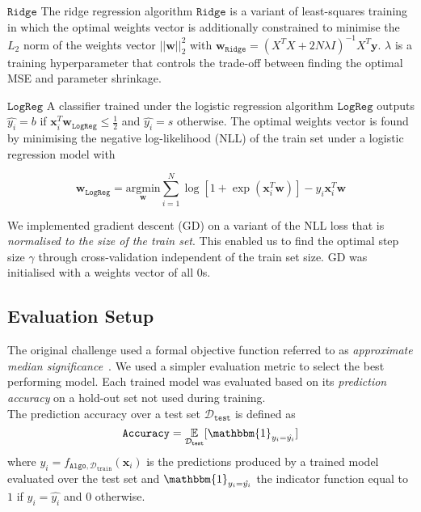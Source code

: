 \documentclass[10pt,conference,compsocconf]{IEEEtran}
\newcommand{\parabf}[1]{\vspace{1mm}\noindent\textbf{#1}}
\newcommand{\Dtrain}{\mathcal{D}_{\mathtt{train}}}
\newcommand{\Dtest}{\mathcal{D}_{\mathtt{test}}}
\newcommand{\features}{\mathbf{x}_i}
\newcommand{\target}{y_i}
\newcommand{\targetvector}{\mathbf{y}}
\newcommand{\weights}{\mathbf{w}}
\newcommand{\classifier}[2]{f_{#1, #2}}
\newcommand{\Train}{\mathtt{Algo}}
\newcommand{\Ridge}{\mathtt{Ridge}}
\newcommand{\LogReg}{\mathtt{LogReg}}
\begin{document}
\parabf{$\Ridge$} The ridge regression algorithm $\Ridge$ is a variant of least-squares training in which the optimal weights vector is additionally constrained to minimise the $L_2$ norm of the weights vector $||\weights||_2^2$ with $\weights_\Ridge = (X^T X + 2N\lambda I)^{-1}X^T \targetvector$. $\lambda$ is a training hyperparameter that controls the trade-off between finding the optimal MSE and parameter shrinkage.

\parabf{$\LogReg$} A classifier trained under the logistic regression algorithm $\LogReg$ outputs $\hat{\target} = b$ if $\features^T \weights_{\LogReg} \leq \frac{1}{2}$ and $\hat{\target} = s$ otherwise. The optimal weights vector is found by minimising the negative log-likelihood (NLL) of the train set under a logistic regression model with

\vspace*{-4mm}
\begin{equation}
	\weights_\LogReg = \underset{\weights}{\text{argmin}} \sum_{i=1}^{N} \log [ 1 + \exp(\features^T\weights) ] - \target\features^T\weights
\end{equation} 

We implemented gradient descent (GD) on a variant of the NLL loss that is \emph{normalised to the size of the train set}. This enabled us to find the optimal step size $\gamma$ through cross-validation independent of the train set size. GD was initialised with a weights vector of all $0$s.

\subsection{Evaluation Setup}
The original challenge used a formal objective function referred to as \emph{approximate median significance}~\cite{HiggsML}. We used a simpler evaluation metric to select the best performing model. Each trained model was evaluated based on its \emph{prediction accuracy} on a hold-out set not used during training.\\
The prediction accuracy over a test set $\Dtest$ is defined as
\begin{equation}
	\mathtt{Accuracy} = \underset{\Dtest}{\mathbb{E}}[ \mathbbm{1}_{\target = \hat{\target}} ]
\end{equation}
where $\hat{\target} = \classifier{\Train}{\Dtrain}(\features)$ is the predictions produced by a trained model evaluated over the test set and $\mathbbm{1}_{\target = \hat{\target}}$ the indicator function equal to $1$ if $\target = \hat{\target}$ and $0$ otherwise.
\end{document}
